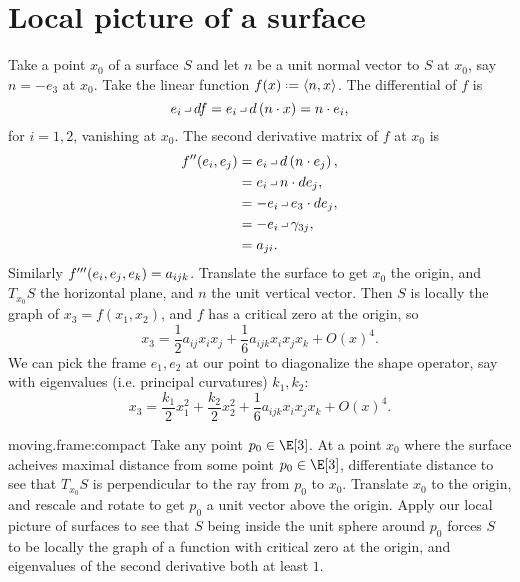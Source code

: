 \section{Local picture of a surface}
Take a point \(x_0\) of a surface \(S\) and let \(n\) be a unit normal vector to \(S\) at \(x_0\), say \(n=-e_3\) at \(x_0\).
Take the linear function \(f(x) \defeq \ip{n}{x}\).
The differential of \(f\) is
\[
e_i \hook df = e_i \hook d\pr{n \cdot x} = n \cdot e_i,
\]
for \(i=1,2\), vanishing at \(x_0\).
The second derivative matrix of \(f\) at \(x_0\) is
\begin{align*}
f''\of{e_i,e_j}
&=
e_i \hook d\pr{n \cdot e_j},
\\
&=
e_i \hook n \cdot de_j,
\\
&=
-e_i \hook e_3 \cdot de_j,
\\
&=
-e_i \hook \gamma_{3j},
\\
&=
a_{ji}.
\end{align*}
Similarly \(f'''\!\left(e_i,e_j,e_k\right)=a_{ijk}\).
Translate the surface to get \(x_0\) the origin, and \(T_{x_0} S\) the horizontal plane, and \(n\) the unit vertical vector.
Then \(S\) is locally the graph of \(x_3=f(x_1,x_2)\), and \(f\) has a critical zero at the origin, so
\[
x_3=\frac{1}{2}a_{ij}x_ix_j+\frac{1}{6}a_{ijk}x_ix_jx_k+O(x)^4.
\]
We can pick the frame \(e_1,e_2\) at our point to diagonalize the shape operator, say with eigenvalues (i.e. principal curvatures) \(k_1,k_2\):
\[
x_3=\frac{k_1}{2}x_1^2+\frac{k_2}{2}x_2^2+\frac{1}{6}a_{ijk}x_ix_jx_k+O(x)^4.
\]
\begin{answer}{moving.frame:compact}
Take any point \(p_0 \in \E[3]\).
At a point \(x_0\) where the surface acheives maximal distance from some point \(p_0\in\E[3]\), differentiate distance to see that \(T_{x_0} S\)  is perpendicular to the ray from \(p_0\) to \(x_0\).
Translate \(x_0\) to the origin, and rescale and rotate to get \(p_0\) a unit vector above the origin.
Apply our local picture of surfaces to see that \(S\) being inside the unit sphere around \(p_0\) forces \(S\) to be locally the graph of a function with critical zero at the origin, and eigenvalues of the second derivative both at least \(1\).
\end{answer}
